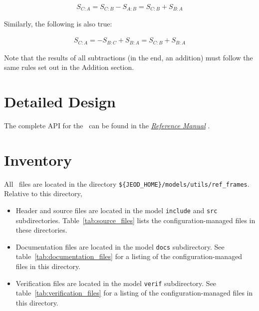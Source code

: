 \begin{gather}\label{simple_subtraction_right}
S_{C:A} = S_{C:B} - S_{A:B} = S_{C:B} + S_{B:A}
\end{gather}

Similarly, the following is also true:

\begin{gather}\label{simple_subtraction_left}
S_{C:A} = -S_{B:C} + S_{B:A} = S_{C:B} + S_{B:A}
\end{gather}

Note that the results of all subtractions (in the end, an addition) must
follow the same rules set out in the Addition section.

\section{Detailed Design}

The complete API for the \ can be found
in the \href{file:refman.pdf} {\em Reference Manual}
\cite{refframesbib:ReferenceManual}.

\section{Inventory}
All \ files are located in the directory \newline
{\tt \$\{JEOD\_HOME\}/models/utils/ref\_frames}.
Relative to this directory,
\begin{itemize}
\vspace{-0.2\baselineskip}
\item Header and source files are located
in the model {\tt include} and {\tt src} subdirectories.
Table~\ref{tab:source_files} lists the
configuration-managed files in these directories.
\vspace{-0.1\baselineskip}
\item Documentation files are located in the model {\tt docs} subdirectory.
See table~\ref{tab:documentation_files}
for a listing of the
configuration-managed files in this directory.
\vspace{-0.1\baselineskip}
\item Verification files are located in the model {\tt verif} subdirectory.
See table~\ref{tab:verification_files}
for a listing of the
configuration-managed files in this directory.
\end{itemize}



